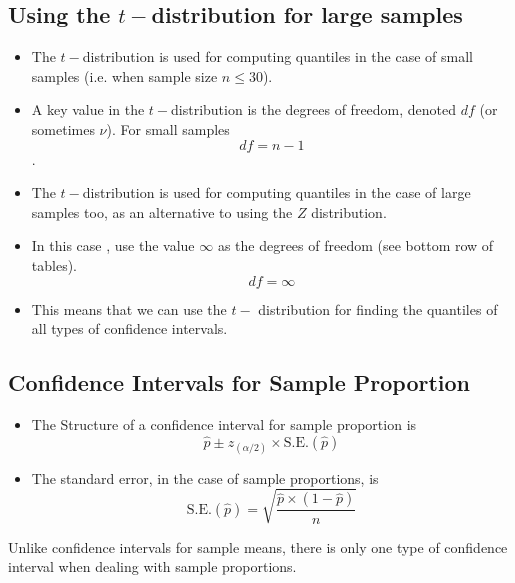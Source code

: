 \documentclass[a4paper,12pt]{article}
\begin{document}

\subsection*{Using the $t-$distribution for large samples}

\begin{itemize}
\item The $t-$distribution is used for computing quantiles in the case of small samples (i.e. when sample size $n \leq 30$).
\item A key value in the $t-$distribution is the degrees of freedom, denoted $df$ (or sometimes $\nu$). For small samples \[ df= n-1\].
\item The $t-$distribution is used for computing quantiles in the case of large samples too, as an alternative to using the $Z$ distribution.
\item In this case , use the value $\infty$ as the degrees of freedom (see bottom row of tables).
\[ df= \infty\]
\item This means that we can use the $t-$ distribution for finding the quantiles of all types of confidence intervals.

\end{itemize}


\subsection*{Confidence Intervals for Sample Proportion}

\begin{itemize}
\item The Structure of a confidence interval for sample proportion is
\[ \hat{p} \pm z_{(\alpha/2)} \times \mbox{S.E.}(\hat{p})\]

\item The standard error, in the case of sample proportions, is
\[ \mbox{S.E.}(\hat{p}) = \sqrt{\frac{\hat{p}\times (1-\hat{p})}{n}}\]

\end{itemize}

\noindent Unlike confidence intervals for sample means, there is only one type of confidence interval when dealing with sample proportions.
\end{document}
